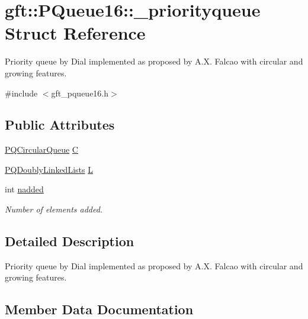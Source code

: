 \hypertarget{structgft_1_1PQueue16_1_1__priorityqueue}{}\section{gft\+:\+:P\+Queue16\+:\+:\+\_\+priorityqueue Struct Reference}
\label{structgft_1_1PQueue16_1_1__priorityqueue}


Priority queue by Dial implemented as proposed by A.\+X. Falcao with circular and growing features.  




{\ttfamily \#include $<$gft\+\_\+pqueue16.\+h$>$}

\subsection*{Public Attributes}
\begin{DoxyCompactItemize}
\item 
\hyperlink{namespacegft_1_1PQueue16_a9170c804b2c99b8035274bfc820f968e}{P\+Q\+Circular\+Queue} \hyperlink{structgft_1_1PQueue16_1_1__priorityqueue_a3b00179eb83c3aceea4078e4b5e4fb53}{C}
\item 
\hyperlink{namespacegft_1_1PQueue16_a2e506a5582bb0b3b911d561e82164a46}{P\+Q\+Doubly\+Linked\+Lists} \hyperlink{structgft_1_1PQueue16_1_1__priorityqueue_a88a19657df74ff6d933e82ca2aacbb7e}{L}
\item 
int \hyperlink{structgft_1_1PQueue16_1_1__priorityqueue_a1d36f79c71162c0d7c8cfb5cc9a56150}{nadded}
\begin{DoxyCompactList}\small\item\em Number of elements added. \end{DoxyCompactList}\end{DoxyCompactItemize}


\subsection{Detailed Description}
Priority queue by Dial implemented as proposed by A.\+X. Falcao with circular and growing features. 

\subsection{Member Data Documentation}
